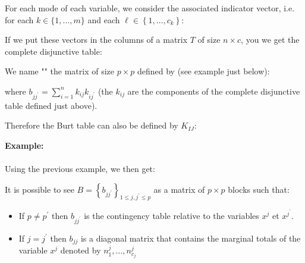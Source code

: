 	For each mode of each variable, we consider the associated indicator vector, i.e. for each $k \in\{1, \ldots, m\}$ and each $\ell \in\left\{1, \ldots, c_{k}\right\}$:
	
	If we put these vectors in the columns of a matrix $T$ of size $n \times c$, you we get the complete disjunctive table:
	
	
	We name "" the matrix of size $p \times p$ defined by (see example just below):
	
	where $b_{j j^{\prime}}=\sum_{i=1}^{n} k_{i j} k_{i j^{\prime}}$ (the $k_{i j}$ are the components of the complete disjunctive table defined just above).
	
	Therefore the Burt table can also be defined by $K_{I J}$:
	
	
	\begin{tcolorbox}[colframe=black,colback=white,sharp corners]
	\textbf{{\Large {}}Example:}\\\\
	Using the previous example, we then get:
	
	\end{tcolorbox}
		It is possible to see $B=\left\{b_{j j^{\prime}}\right\}_{1 \leqslant j, j^{\prime} \leqslant p}$ as a matrix of $p \times p$ blocks such that:
	\begin{itemize}
		\item If $p \neq p^{\prime}$ then $b_{j j^{\prime}}$ is the contingency table relative to the variables $x^{j}$ et $x^{j^{\prime}}$.
		
		\item If $j=j^{\prime}$ then $b_{j j}$ is a diagonal matrix that contains the marginal totals of the variable $x^{j}$ denoted by $n_{1}^{j}, \ldots, n_{c_{j}}^{j}$
	\end{itemize}
	
